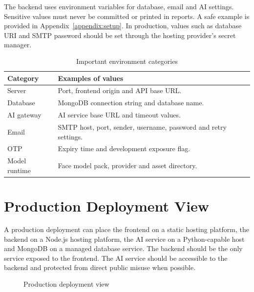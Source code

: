 The backend uses environment variables for database, email and AI settings. Sensitive values must never be committed or printed in reports. A safe example is provided in Appendix~\ref{appendix:setup}. In production, values such as database URI and SMTP password should be set through the hosting provider's secret manager.

\begin{table}[H]
\centering
\caption{Important environment categories}
\label{tab:env-categories}
\begin{tabularx}{\textwidth}{p{3.5cm} X}
\toprule
\textbf{Category} & \textbf{Examples of values}\\
\midrule
Server & Port, frontend origin and API base URL.\\
Database & MongoDB connection string and database name.\\
AI gateway & AI service base URL and timeout values.\\
Email & SMTP host, port, sender, username, password and retry settings.\\
OTP & Expiry time and development exposure flag.\\
Model runtime & Face model pack, provider and asset directory.\\
\bottomrule
\end{tabularx}
\end{table}

\section{Production Deployment View}

A production deployment can place the frontend on a static hosting platform, the backend on a Node.js hosting platform, the AI service on a Python-capable host and MongoDB on a managed database service. The backend should be the only service exposed to the frontend. The AI service should be accessible to the backend and protected from direct public misuse when possible.

\begin{figure}[H]
\centering
{}
\caption{Production deployment view}
\label{fig:production-deployment}
\end{figure}

